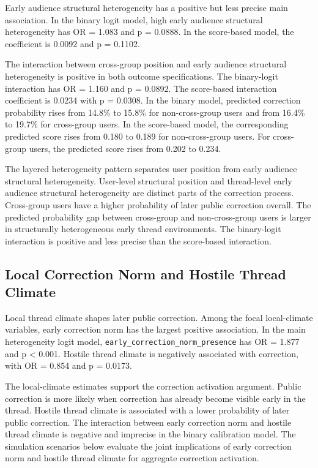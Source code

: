 \documentclass[namedate,unnumsec,webpdf,contemporary,large]{oup-authoring-template}
\begin{document}
Early audience structural heterogeneity has a positive but less precise main association. In the binary logit model, high early audience structural heterogeneity has OR = 1.083 and p = 0.0888. In the score-based model, the coefficient is 0.0092 and p = 0.1102.

The interaction between cross-group position and early audience structural heterogeneity is positive in both outcome specifications. The binary-logit interaction has OR = 1.160 and p = 0.0892. The score-based interaction coefficient is 0.0234 with p = 0.0308. In the binary model, predicted correction probability rises from 14.8\% to 15.8\% for non-cross-group users and from 16.4\% to 19.7\% for cross-group users. In the score-based model, the corresponding predicted score rises from 0.180 to 0.189 for non-cross-group users. For cross-group users, the predicted score rises from 0.202 to 0.234.

The layered heterogeneity pattern separates user position from early audience structural heterogeneity. User-level structural position and thread-level early audience structural heterogeneity are distinct parts of the correction process. Cross-group users have a higher probability of later public correction overall. The predicted probability gap between cross-group and non-cross-group users is larger in structurally heterogeneous early thread environments. The binary-logit interaction is positive and less precise than the score-based interaction.

\subsection{Local Correction Norm and Hostile Thread Climate}


Local thread climate shapes later public correction. Among the focal local-climate variables, early correction norm has the largest positive association. In the main heterogeneity logit model, \texttt{early\_correction\_norm\_presence} has OR = 1.877 and p \textless{} 0.001. Hostile thread climate is negatively associated with correction, with OR = 0.854 and p = 0.0173.

The local-climate estimates support the correction activation argument. Public correction is more likely when correction has already become visible early in the thread. Hostile thread climate is associated with a lower probability of later public correction. The interaction between early correction norm and hostile thread climate is negative and imprecise in the binary calibration model. The simulation scenarios below evaluate the joint implications of early correction norm and hostile thread climate for aggregate correction activation.
\end{document}

